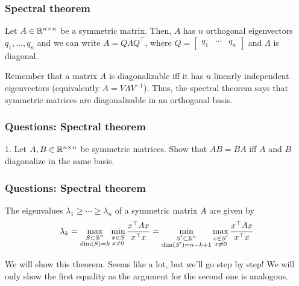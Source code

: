 \documentclass{beamer}
\begin{document}
\begin{frame}[t]
\frametitle{Spectral theorem}
\begin{theorem}
Let $A \in \mathbb{R}^{n \times n}$ be a symmetric matrix. Then, $A$ has $n$ orthogonal eigenvectors $q_1, \dots, q_n$ and we can write $A = Q \Lambda Q^\top$, where $Q = \begin{bmatrix} q_1 & \cdots & q_n \end{bmatrix}$ and $\Lambda$ is diagonal.
\end{theorem}

Remember that a matrix $A$ is diagonalizable iff it has $n$ linearly independent eigenvectors (equivalently $A = V \Lambda V^{-1}$). Thus, the spectral theorem says that symmetric matrices are diagonalizable in an orthogonal basis.
\end{frame}

\begin{frame}[t]
\frametitle{Questions: Spectral theorem}
1. Let $A, B \in \mathbb{R}^{n \times n}$ be symmetric matrices. Show that $AB = BA$ iff $A$ and $B$ diagonalize in the same basis. 
\pause
\end{frame}

\iffalse
\begin{frame}[t]
\frametitle{Questions: Spectral theorem}
\begin{theorem}
The eigenvalues $\lambda_1 \geq \cdots \geq \lambda_n$ of a symmetric matrix $A$ are given by
\begin{align*}
\lambda_k = \max_{\substack{S \subset \mathbb{R}^n \\ \text{dim}(S) = k}} \min_{\substack{x \in S \\ x \neq 0}} \frac{x^\top A x}{x^\top x} = \min_{\substack{S' \subset \mathbb{R}^n \\ \text{dim}(S') = n-k+1}} \max_{\substack{x \in S' \\ x \neq 0}} \frac{x^\top A x}{x^\top x}
\end{align*}
\end{theorem}
We will show this theorem. Seems like a lot, but we'll go step by step! We will only show the first equality as the argument for the second one is analogous.
\end{frame}
\end{document}
